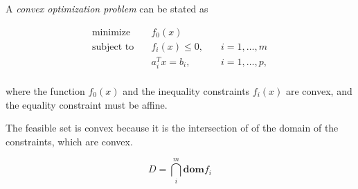 A \textit{convex optimization problem} can be stated as

\begin{equation}
    \begin{aligned}
        \text{minimize} \quad& f_0(x) \quad& \\
        \text{subject to} \quad& f_i(x) \leq 0, \quad& i = 1,\ldots,m \\
        \quad& a_i^T x=b_i, \quad& i = 1,\ldots,p, \\
    \end{aligned}
\end{equation}

where the function $f_0(x)$ and the inequality constraints $f_i(x)$ are convex, and the equality constraint must be affine.

The feasible set is convex because it is the intersection of of the domain of the constraints, which are convex. 

\begin{equation}
    D = \bigcap_i^m \textbf{dom} f_i
\end{equation}